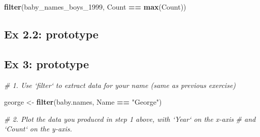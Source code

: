 \documentclass[]{book}
\newenvironment{Shaded}{\begin{snugshade}}{\end{snugshade}}
\newcommand{\KeywordTok}[1]{\textcolor[rgb]{0.13,0.29,0.53}{\textbf{#1}}}
\newcommand{\DecValTok}[1]{\textcolor[rgb]{0.00,0.00,0.81}{#1}}
\newcommand{\StringTok}[1]{\textcolor[rgb]{0.31,0.60,0.02}{#1}}
\newcommand{\CommentTok}[1]{\textcolor[rgb]{0.56,0.35,0.01}{\textit{#1}}}
\newcommand{\OperatorTok}[1]{\textcolor[rgb]{0.81,0.36,0.00}{\textbf{#1}}}
\newcommand{\NormalTok}[1]{#1}
\begin{document}
\begin{Shaded}
\begin{Highlighting}[]
\KeywordTok{filter}\NormalTok{(baby_names_boys_}\DecValTok{1999}\NormalTok{, Count }\OperatorTok{==}\StringTok{ }\KeywordTok{max}\NormalTok{(Count))}
\end{Highlighting}
\end{Shaded}

\subsection{Ex 2.2: prototype}\label{ex-2.2-prototype}

\begin{Shaded}
\end{Shaded}

\subsection{Ex 3: prototype}\label{ex-3-prototype}

\begin{Shaded}
\begin{Highlighting}[]
\CommentTok{# 1. Use `filter` to extract data for your name (same as previous exercise)  }
\end{Highlighting}
\end{Shaded}

\begin{Shaded}
\begin{Highlighting}[]
\NormalTok{george <-}\StringTok{ }\KeywordTok{filter}\NormalTok{(baby.names, Name }\OperatorTok{==}\StringTok{ "George"}\NormalTok{)}
\end{Highlighting}
\end{Shaded}

\begin{Shaded}
\begin{Highlighting}[]
\CommentTok{# 2.  Plot the data you produced in step 1 above, with `Year` on the x-axis}
\CommentTok{#     and `Count` on the y-axis.}
\end{Highlighting}
\end{Shaded}
\end{document}
